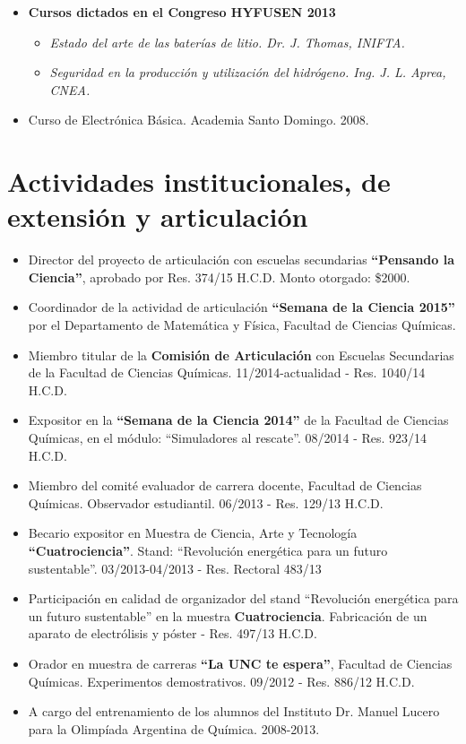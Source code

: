 \documentclass[10pt]{article}
\begin{document}
\begin{itemize}
\begin{itemize}
   \end{itemize}
  \item {\bf Cursos dictados en el Congreso HYFUSEN 2013}
  \begin{itemize}
   \item {\it Estado del arte de las baterías de litio. Dr. J. Thomas, INIFTA.}
   \item {\it Seguridad en la producción y utilización del hidrógeno. Ing. J. L. Aprea, CNEA.}
  \end{itemize} 
  \item {Curso de Electrónica Básica}. Academia Santo Domingo. 2008.
 \end{itemize}

\section{Actividades institucionales, de extensión y articulación}
\begin{itemize}
 \item Director del proyecto de articulación con escuelas secundarias {\bf ``Pensando la Ciencia''}, aprobado por Res. 374/15 H.C.D. Monto otorgado: \$2000.
 \item Coordinador de la actividad de articulación {\bf ``Semana de la Ciencia 2015''} por el Departamento de Matemática y Física, Facultad de Ciencias Químicas.
 \item Miembro titular de la {\bf Comisión de Articulación} con Escuelas Secundarias de la Facultad de Ciencias Químicas.  11/2014-actualidad - Res. 1040/14 H.C.D.
 \item Expositor en la {\bf ``Semana de la Ciencia 2014''} de la Facultad de Ciencias Químicas, en el módulo: ``Simuladores al rescate''. 08/2014 - Res. 923/14 H.C.D. 
 \item { Miembro del comité evaluador de carrera docente}, Facultad de Ciencias Químicas. Observador estudiantil. 06/2013 - Res. 129/13 H.C.D. 
 \item  Becario expositor en Muestra de Ciencia, Arte y Tecnología {\bf ``Cuatrociencia''}. Stand: ``Revolución energética para un futuro sustentable''. 03/2013-04/2013 - Res. Rectoral 483/13 
 \item Participación en calidad de organizador del stand ``Revolución energética para un futuro sustentable'' en la muestra {\bf Cuatrociencia}. Fabricación de un aparato de electrólisis y póster - Res. 497/13 H.C.D.
 \item Orador en muestra de carreras {\bf ``La UNC te espera''}, Facultad de Ciencias Químicas. Experimentos demostrativos. 09/2012 - Res. 886/12 H.C.D.
 \item A cargo del entrenamiento de los alumnos del Instituto Dr. Manuel Lucero para la Olimpíada Argentina de Química. 2008-2013.
 \end{itemize}
 
\end{document}
